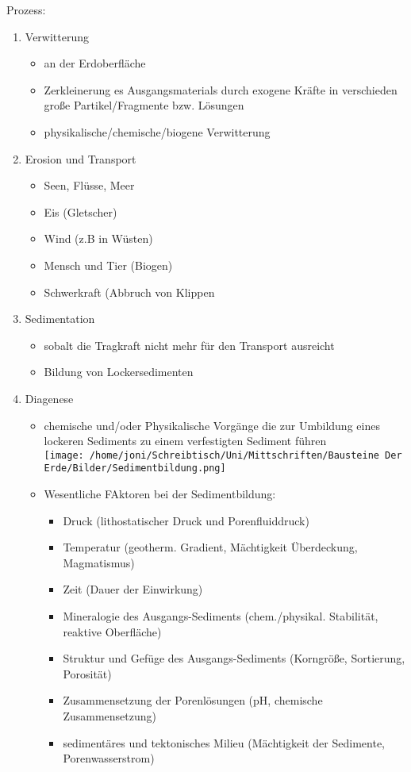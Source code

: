 \documentclass[a4, 12pt]{scrreprt}
\begin{document}
Prozess:
\begin{enumerate}
\item Verwitterung
	\begin{itemize}
	\item an der Erdoberfläche
	\item Zerkleinerung es Ausgangsmaterials durch exogene Kräfte in 			verschieden große Partikel/Fragmente bzw. Lösungen
	\item physikalische/chemische/biogene Verwitterung
	\end{itemize}
\item Erosion und Transport
	\begin{itemize}
	\item Seen, Flüsse, Meer
	\item Eis (Gletscher)
	\item Wind (z.B in Wüsten)
	\item Mensch und Tier (Biogen)
	\item Schwerkraft (Abbruch von Klippen
	\end{itemize}
\item Sedimentation
	\begin{itemize}
	\item sobalt die Tragkraft nicht mehr für den Transport ausreicht
	\item Bildung von Lockersedimenten
	\end{itemize}
\item Diagenese
	\begin{itemize}
	\item chemische und/oder Physikalische Vorgänge die zur Umbildung eines lockeren Sediments zu einem verfestigten Sediment führen\\
	\texttt{[image: /home/joni/Schreibtisch/Uni/Mittschriften/Bausteine Der Erde/Bilder/Sedimentbildung.png]}
	\item Wesentliche FAktoren bei der Sedimentbildung:
		\begin{itemize}
		\item Druck (lithostatischer Druck und Porenfluiddruck)
		\item Temperatur (geotherm. Gradient, Mächtigkeit Überdeckung, Magmatismus)
		\item Zeit (Dauer der Einwirkung)
		\item Mineralogie des Ausgangs-Sediments (chem./physikal. Stabilität, reaktive Oberfläche)
		\item Struktur und Gefüge des Ausgangs-Sediments (Korngröße, Sortierung, Porosität)
		\item Zusammensetzung der Porenlösungen (pH, chemische Zusammensetzung)
		\item sedimentäres und tektonisches Milieu (Mächtigkeit der Sedimente, Porenwasserstrom)
		\end{itemize}
	\end{itemize}
\end{enumerate}
\end{document}
